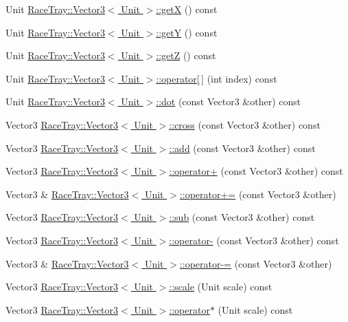 \begin{DoxyCompactItemize}
\item 
Unit \hyperlink{group___math_gad352703f15280f9a3e92ab30f8f0a559}{Race\-Tray\-::\-Vector3$<$ Unit $>$\-::get\-X} () const 
\item 
Unit \hyperlink{group___math_ga958d217bc40bbecc3f7710f7d21d69e2}{Race\-Tray\-::\-Vector3$<$ Unit $>$\-::get\-Y} () const 
\item 
Unit \hyperlink{group___math_ga78a16de98839cff6799b841cd5dce3a5}{Race\-Tray\-::\-Vector3$<$ Unit $>$\-::get\-Z} () const 
\item 
Unit \hyperlink{group___math_gac176f26759f013157ae339e037abcbbd}{Race\-Tray\-::\-Vector3$<$ Unit $>$\-::operator\mbox{[}$\,$\mbox{]}} (int index) const 
\item 
Unit \hyperlink{group___math_ga6a55bfca19953a2b43b30796e4ce3f67}{Race\-Tray\-::\-Vector3$<$ Unit $>$\-::dot} (const Vector3 \&other) const 
\item 
Vector3 \hyperlink{group___math_ga3bad6b5bd57c5e674c6cb47e6eb75246}{Race\-Tray\-::\-Vector3$<$ Unit $>$\-::cross} (const Vector3 \&other) const 
\item 
Vector3 \hyperlink{group___math_gaf130562c28e9acf79a1947eae9bc583b}{Race\-Tray\-::\-Vector3$<$ Unit $>$\-::add} (const Vector3 \&other) const 
\item 
Vector3 \hyperlink{group___math_ga66fc04cc87dd36820cc8cad9d3ba7fae}{Race\-Tray\-::\-Vector3$<$ Unit $>$\-::operator+} (const Vector3 \&other) const 
\item 
Vector3 \& \hyperlink{group___math_ga5ccb50254f27230d20aab11372215fbc}{Race\-Tray\-::\-Vector3$<$ Unit $>$\-::operator+=} (const Vector3 \&other)
\item 
Vector3 \hyperlink{group___math_ga76645af9d0562c9964fcd0850a327288}{Race\-Tray\-::\-Vector3$<$ Unit $>$\-::sub} (const Vector3 \&other) const 
\item 
Vector3 \hyperlink{group___math_gaa69c327bce74c6fccc67732aa72d51e4}{Race\-Tray\-::\-Vector3$<$ Unit $>$\-::operator-\/} (const Vector3 \&other) const 
\item 
Vector3 \& \hyperlink{group___math_gae0287f848b8e46e8e2abbaa1a8940f9d}{Race\-Tray\-::\-Vector3$<$ Unit $>$\-::operator-\/=} (const Vector3 \&other)
\item 
Vector3 \hyperlink{group___math_ga9282288d74a882eb1b049abc21f8b0c7}{Race\-Tray\-::\-Vector3$<$ Unit $>$\-::scale} (Unit scale) const 
\item 
Vector3 \hyperlink{group___math_ga89a8462c9f9c3802cbc7092f234e9a04}{Race\-Tray\-::\-Vector3$<$ Unit $>$\-::operator$\ast$} (Unit scale) const 

\end{DoxyCompactItemize}
